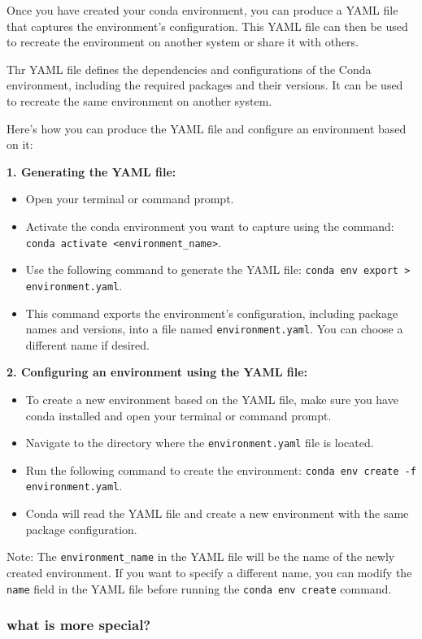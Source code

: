 Once you have created your conda environment, you can produce a YAML file that captures the environment's configuration. This YAML file can then be used to recreate the environment on another system or share it with others. 

Thr YAML file defines the dependencies and configurations of the Conda environment, including the required packages and their versions. It can be used to recreate the same environment on another system.

Here's how you can produce the YAML file and configure an environment based on it:

\textbf{1. Generating the YAML file:}
\begin{itemize}
	\item Open your terminal or command prompt.
	\item Activate the conda environment you want to capture using the command: \texttt{conda activate <environment\_name>}.
	\item Use the following command to generate the YAML file: \texttt{conda env export > environment.yaml}.
	\item This command exports the environment's configuration, including package names and versions, into a file named \texttt{environment.yaml}. You can choose a different name if desired.
\end{itemize}

\textbf{2. Configuring an environment using the YAML file:}
\begin{itemize}
	\item To create a new environment based on the YAML file, make sure you have conda installed and open your terminal or command prompt.
	\item Navigate to the directory where the \texttt{environment.yaml} file is located.
	\item Run the following command to create the environment: \texttt{conda env create -f environment.yaml}.
	\item Conda will read the YAML file and create a new environment with the same package configuration.
\end{itemize}

Note: The \texttt{environment\_name} in the YAML file will be the name of the newly created environment. If you want to specify a different name, you can modify the \texttt{name} field in the YAML file before running the \texttt{conda env create} command.


\subsubsection{what is more special?}

